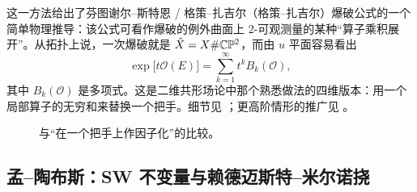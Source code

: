 这一方法给出了芬图谢尔--斯特恩 / 格策--扎吉尔（格策--扎吉尔）爆破公式的一个简单物理推导：该公式可看作爆破的例外曲面上 2-可观测量的某种“算子乘积展开”。从拓扑上说，一次爆破就是 $\hat X=X\#\mathbb{C}\mathbb{P}^{2}$，而由 $u$ 平面容易看出
\begin{equation}
  \exp\bigl[t\mathcal{O}(E)\bigr]=\sum_{k=1}^{\infty}t^{k}B_{k}(\mathcal{O}),
  \tag{10.1}
\end{equation}
其中 $B_{k}(\mathcal{O})$ 是多项式。这是二维共形场论中那个熟悉做法的四维版本：用一个局部算子的无穷和来替换一个把手。细节见 \cite{ref38}；更高阶情形的推广见 \cite{ref10,ref24}。

\begin{figure}[H]
  \centering
  \caption{与“在一个把手上作因子化”的比较。}
  \label{fig:handle-factorization}
\end{figure}



\subsection{孟--陶布斯：SW 不变量与赖德迈斯特--米尔诺挠}

